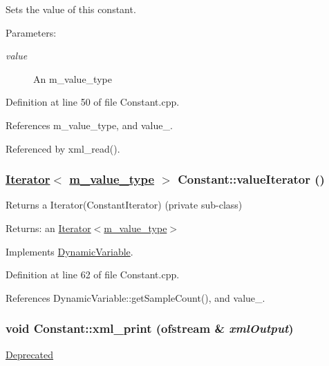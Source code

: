 Sets the value of this constant. \begin{Desc}
\item[Parameters:]
\begin{description}
\item[{\em value}]An m\_\-value\_\-type \end{description}
\end{Desc}


Definition at line 50 of file Constant.cpp.

References m\_\-value\_\-type, and value\_\-.

Referenced by xml\_\-read().\hypertarget{classConstant_a4}{
\subsubsection[valueIterator]{\setlength{\rightskip}{0pt plus 5cm}\hyperlink{classIterator}{Iterator}$<$ \hyperlink{Types_8h_a3}{m\_\-value\_\-type} $>$ Constant::value\-Iterator ()}}
\label{classConstant_a4}


Returns a Iterator(Constant\-Iterator) (private sub-class) \begin{Desc}
\item[Returns:]an \hyperlink{classIterator}{Iterator$<$m\_\-value\_\-type$>$} \end{Desc}


Implements \hyperlink{classDynamicVariable_a3}{Dynamic\-Variable}.

Definition at line 62 of file Constant.cpp.

References Dynamic\-Variable::get\-Sample\-Count(), and value\_\-.\hypertarget{classConstant_a8}{
\subsubsection[xml\_\-print]{\setlength{\rightskip}{0pt plus 5cm}void Constant::xml\_\-print (ofstream \& {\em xml\-Output})}}
\label{classConstant_a8}


\begin{Desc}
\item[\hyperlink{deprecated__deprecated000005}{Deprecated}]\end{Desc}


